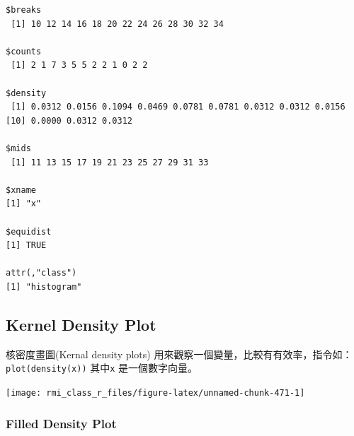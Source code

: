 \documentclass[]{book}
\newenvironment{Shaded}{\begin{snugshade}}{\end{snugshade}}
\newcommand{\CommentTok}[1]{\textcolor[rgb]{0.56,0.35,0.01}{\textit{#1}}}
\newcommand{\DataTypeTok}[1]{\textcolor[rgb]{0.13,0.29,0.53}{#1}}
\newcommand{\KeywordTok}[1]{\textcolor[rgb]{0.13,0.29,0.53}{\textbf{#1}}}
\newcommand{\NormalTok}[1]{#1}
\newcommand{\OperatorTok}[1]{\textcolor[rgb]{0.81,0.36,0.00}{\textbf{#1}}}
\newcommand{\StringTok}[1]{\textcolor[rgb]{0.31,0.60,0.02}{#1}}
\theoremstyle{definition}
\theoremstyle{definition}
\theoremstyle{definition}
\theoremstyle{remark}
\begin{document}
\begin{verbatim}
$breaks
 [1] 10 12 14 16 18 20 22 24 26 28 30 32 34

$counts
 [1] 2 1 7 3 5 5 2 2 1 0 2 2

$density
 [1] 0.0312 0.0156 0.1094 0.0469 0.0781 0.0781 0.0312 0.0312 0.0156
[10] 0.0000 0.0312 0.0312

$mids
 [1] 11 13 15 17 19 21 23 25 27 29 31 33

$xname
[1] "x"

$equidist
[1] TRUE

attr(,"class")
[1] "histogram"
\end{verbatim}

\hypertarget{kernel-density-plot}{%
\subsection{Kernel Density Plot}\label{kernel-density-plot}}

核密度畫圖(Kernal density plots)
用來觀察一個變量，比較有有效率，指令如：\texttt{plot(density(x))}
其中\texttt{x} 是一個數字向量。

\begin{Shaded}
\end{Shaded}

\begin{center}\texttt{[image: rmi\_class\_r\_files/figure-latex/unnamed-chunk-471-1]} \end{center}

\hypertarget{filled-density-plot}{%
\subsubsection{Filled Density Plot}\label{filled-density-plot}}

\begin{Shaded}
\end{Shaded}
\end{document}
